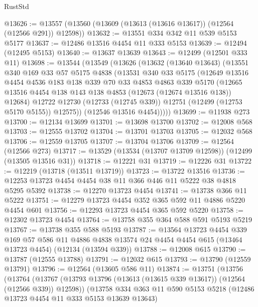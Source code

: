 \begin{lexlean}{RustStd}
\begin{coremodule}
{\begin{coremodule}
{{{{{{{{{{{{{{{{{{{{{{{{{{{{{{{{{{{{{{{{{{{{{{{{{{{{{{{{{{{{{{{{{{{{{{{{{{{{{{{{@13626 := @13557 (@13560 (@13609 (@13613 (@13616 @13617)) (@12564 (@12566 @291)) @12598))
@13632 := @13551 @334 @342 @11 @539 @5153 @5177
@13637 := @12486 @13516 @4454 @11 @333 @5153
@13639 := @12494 (@12495 @5153)
@13640 := @13637 @13639
@13643 := @12499 (@12501 @333 @11)
@13698 := @13544
    (@13549
      (@13626
        (@13632
          (@13640 @13643)
          (@13551
            @340
            @169
            @33
            @57
            @5175
            @4838
            (@13531
              @340
              @33
              @5175
              (@12649
                @13516
                @4454
                @4536
                @183
                @138
                @339
                @70
                @33
                @4853
                @4863
                @339
                @5170
                (@12665 @13516 @4454 @138 @143 @138 @4853 (@12673 (@12674 @13516 @138)) @12684)
                @12722
                @12730
                (@12733 (@12745 @339))
                @12751
                (@12499 (@12753 @5170 @5155))
                @12575))
            (@12546 @13516 @4454)))))
@13699 := @11938 @273
@13700 := @12134 @13699
@13701 := @13698 @13700
@13702 := @12008 @568
@13703 := @12555 @13702
@13704 := @13701 @13703
@13705 := @12032 @568
@13706 := @12559 @13705
@13707 := @13704 @13706
@13709 := @12564 (@12566 @273)
@13717 := @13529 (@13534 (@13707 @13709 @12598)) (@12499 (@13505 @13516 @31))
@13718 := @12221 @31
@13719 := @12226 @31
@13722 := @12219 (@13718 (@13511 @13719))
@13723 := @13722 @13516
@13736 := @12253 @13723 @4454 @4454 @38 @11 @366 @446 @11 @5222 @38 @4818 @5295 @5392
@13738 := @12270 @13723 @4454
@13741 := @13738 @366 @11 @5222
@13751 := @12279 @13723 @4454 @352 @365 @592 @11 @4886 @5220 @4454 @601
@13756 := @12293 @13723 @4454 @365 @592 @5220
@13758 := @12302 @13723 @4454
@13764 := @13758 @355 @364 @588 @591 @5193 @5219
@13767 := @13738 @355 @588 @5193
@13787 := @13564
    @13723
    @4454
    @339
    @169
    @57
    @586
    @11
    @4886
    @4838
    @13574
    @24
    @4454
    @4454
    @615
    (@13464 @13723 @4454)
    (@12134 (@13594 @339))
@13788 := @12008 @615
@13790 := @13787 (@12555 @13788)
@13791 := @12032 @615
@13793 := @13790 (@12559 @13791)
@13796 := @12564 (@13605 @586 @11)
@13874 := @13751
    (@13756
      (@13764
        (@13767 (@13793 @13796 (@13613 (@13615 @339 @13617)) (@12564 (@12566 @339)) @12598))
        (@13758
          @334
          @363
          @11
          @590
          @5153
          @5218
          (@12486 @13723 @4454 @11 @333 @5153 @13639 @13643)
}}}}}}}}}}}}}}}}}}}}}}}}}}}}}}}}}}}}}}}}}}}}}}}}}}}}}}}}}}}}}}}}}}}}}}}}}}}}}}}}
\end{coremodule}}
\end{coremodule}
\end{lexlean}
